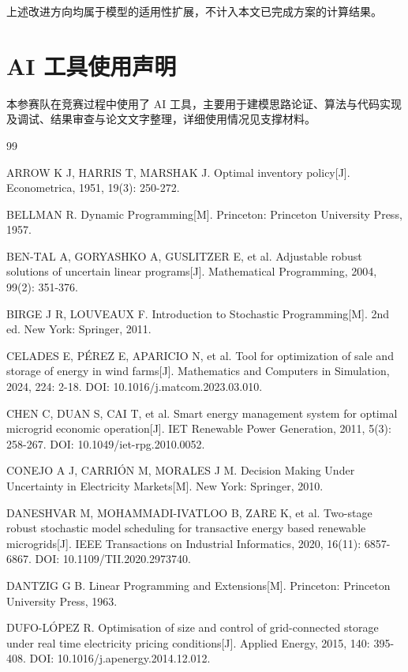 \documentclass[withoutpreface,bwprint]{cumcmthesis}
\begin{document}
上述改进方向均属于模型的适用性扩展，不计入本文已完成方案的计算结果。

\section{AI 工具使用声明}

本参赛队在竞赛过程中使用了 AI 工具，主要用于建模思路论证、算法与代码实现及调试、结果审查与论文文字整理，详细使用情况见支撑材料。

\clearpage
{\small
\begin{thebibliography}{99}

 ARROW K J, HARRIS T, MARSHAK J. Optimal inventory policy[J]. Econometrica, 1951, 19(3): 250-272.

 BELLMAN R. Dynamic Programming[M]. Princeton: Princeton University Press, 1957.

 BEN-TAL A, GORYASHKO A, GUSLITZER E, et al. Adjustable robust solutions of uncertain linear programs[J]. Mathematical Programming, 2004, 99(2): 351-376.

 BIRGE J R, LOUVEAUX F. Introduction to Stochastic Programming[M]. 2nd ed. New York: Springer, 2011.

 CELADES E, PÉREZ E, APARICIO N, et al. Tool for optimization of sale and storage of energy in wind farms[J]. Mathematics and Computers in Simulation, 2024, 224: 2-18. DOI: 10.1016/j.matcom.2023.03.010.

 CHEN C, DUAN S, CAI T, et al. Smart energy management system for optimal microgrid economic operation[J]. IET Renewable Power Generation, 2011, 5(3): 258-267. DOI: 10.1049/iet-rpg.2010.0052.

 CONEJO A J, CARRIÓN M, MORALES J M. Decision Making Under Uncertainty in Electricity Markets[M]. New York: Springer, 2010.

 DANESHVAR M, MOHAMMADI-IVATLOO B, ZARE K, et al. Two-stage robust stochastic model scheduling for transactive energy based renewable microgrids[J]. IEEE Transactions on Industrial Informatics, 2020, 16(11): 6857-6867. DOI: 10.1109/TII.2020.2973740.

 DANTZIG G B. Linear Programming and Extensions[M]. Princeton: Princeton University Press, 1963.

 DUFO-LÓPEZ R. Optimisation of size and control of grid-connected storage under real time electricity pricing conditions[J]. Applied Energy, 2015, 140: 395-408. DOI: 10.1016/j.apenergy.2014.12.012.


\end{thebibliography}}
\end{document}
